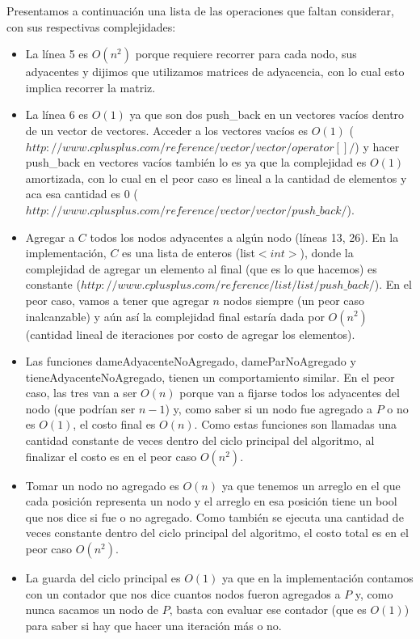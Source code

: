 \documentclass[a4paper]{article}
\begin{document}
\vspace{0.3cm} 
Presentamos a continuación una lista de las operaciones que faltan considerar, con sus respectivas complejidades:
\begin{itemize}
\item La línea 5 es $O(n^2)$ porque requiere recorrer para cada nodo, sus adyacentes y dijimos que utilizamos matrices de adyacencia, con lo cual esto implica recorrer la matriz.
\item La línea 6 es $O(1)$ ya que son dos push\_back en un vectores vacíos dentro de un vector de vectores. Acceder a los vectores vacíos es $O(1)$ ($http://www.cplusplus.com/reference/vector/vector/operator[]/$) y hacer push\_back en vectores vacíos también lo es ya que la complejidad es $O(1)$ amortizada, con lo cual en el peor caso es lineal a la cantidad de elementos y aca esa cantidad es 0 \newline ($http://www.cplusplus.com/reference/vector/vector/push\_back/$).
\item Agregar a $C$ todos los nodos adyacentes a algún nodo (líneas 13, 26). En la implementación, $C$ es una lista de enteros (list$<int>$), donde la complejidad de agregar un elemento al final (que es lo que hacemos) es constante ($http://www.cplusplus.com/reference/list/list/push\_back/$). En el peor caso, vamos a tener que agregar $n$ nodos siempre (un peor caso inalcanzable) y aún así la complejidad final estaría dada por $O(n^2)$ (cantidad lineal de iteraciones por costo de agregar los elementos).
\item Las funciones dameAdyacenteNoAgregado, dameParNoAgregado y tieneAdyacenteNoAgregado, tienen un comportamiento similar. En el peor caso, las tres van a ser $O(n)$ porque van a fijarse todos los adyacentes del nodo (que podrían ser $n - 1$) y, como saber si un nodo fue agregado a $P$ o no es $O(1)$, el costo final es $O(n)$. Como estas funciones son llamadas una cantidad constante de veces dentro del ciclo principal del algoritmo, al finalizar el costo es en el peor caso $O(n^2)$.
\item Tomar un nodo no agregado es $O(n)$ ya que tenemos un arreglo en el que cada posición representa un nodo y el arreglo en esa posición tiene un bool que nos dice si fue o no agregado. Como también se ejecuta una cantidad de veces constante dentro del ciclo principal del algoritmo, el costo total es en el peor caso $O(n^2)$.
\item La guarda del ciclo principal es $O(1)$ ya que en la implementación contamos con un contador que nos dice cuantos nodos fueron agregados a $P$ y, como nunca sacamos un nodo de $P$, basta con evaluar ese contador (que es $O(1)$) para saber si hay que hacer una iteración más o no.

\end{itemize}
\end{document}
